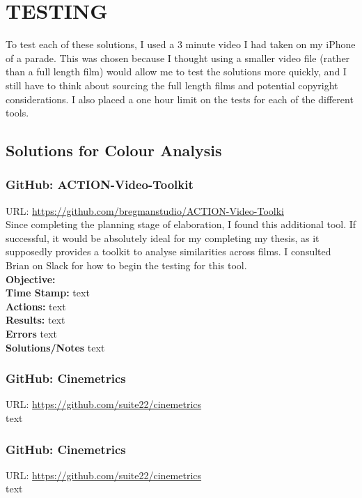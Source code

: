 \documentclass{article}
\begin{document}
\pagebreak

\section{TESTING}

To test each of these solutions, I used a 3 minute video I had taken on my iPhone of a parade. This was chosen because I thought using a smaller video file (rather than a full length film) would allow me to test the solutions more quickly, and I still have to think about sourcing the full length films and potential copyright considerations. I also placed a one hour limit on the tests for each of the different tools.

\subsection{Solutions for Colour Analysis}

\subsubsection{GitHub: ACTION-Video-Toolkit}
URL: \url{https://github.com/bregmanstudio/ACTION-Video-Toolki}\\
Since completing the planning stage of elaboration, I found this additional tool. If successful, it would be absolutely ideal for my completing my thesis, as it supposedly provides a toolkit to analyse similarities across films. I consulted Brian on Slack for how to begin the testing for this tool.\\

\textbf{Objective:}\\
\textbf{Time Stamp:} text\\
\textbf{Actions:} text\\
\textbf{Results:} text\\
\textbf{Errors} text\\
\textbf{Solutions/Notes} text\\

\subsubsection{GitHub: Cinemetrics}
URL: \url{https://github.com/suite22/cinemetrics}\\
text

\subsubsection{GitHub: Cinemetrics}
URL: \url{https://github.com/suite22/cinemetrics}\\
text
\end{document}
